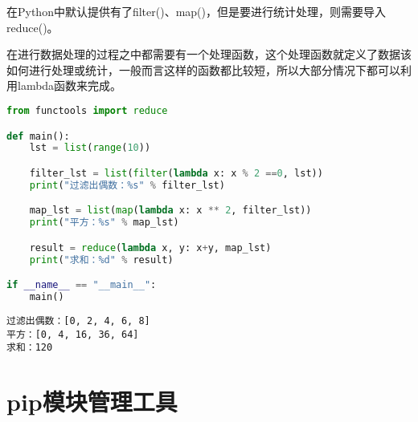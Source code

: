 在Python中默认提供有了filter()、map()，但是要进行统计处理，则需要导入reduce()。

\begin{table}[H]
	\centering
	\caption{MapReduce数据处理函数}
\end{table}

在进行数据处理的过程之中都需要有一个处理函数，这个处理函数就定义了数据该如何进行处理或统计，一般而言这样的函数都比较短，所以大部分情况下都可以利用lambda函数来完成。\\


\begin{lstlisting}[language=Python]
from functools import reduce

def main():
    lst = list(range(10))

    filter_lst = list(filter(lambda x: x % 2 ==0, lst))
    print("过滤出偶数：%s" % filter_lst)

    map_lst = list(map(lambda x: x ** 2, filter_lst))
    print("平方：%s" % map_lst)

    result = reduce(lambda x, y: x+y, map_lst)
    print("求和：%d" % result)

if __name__ == "__main__":
    main()
\end{lstlisting}

\begin{tcolorbox}
	\begin{verbatim}
过滤出偶数：[0, 2, 4, 6, 8]
平方：[0, 4, 16, 36, 64]
求和：120
\end{verbatim}
\end{tcolorbox}

\newpage

\section{pip模块管理工具}

